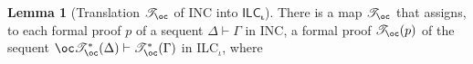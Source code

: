 \documentclass[a4paper]{article}
\theoremstyle{definition}
\theoremstyle{theorem}
\newtheorem{lemma}[definition]{Lemma}
\theoremstyle{remark}
\begin{document}
\begin{lemma}[Translation $\mathscr{T}_{\oc}$ of \textsf{INC} into $\textsf{ILC$_{\boldsymbol{\iota}}$}$]
\label{LemTranslationOfILK_muIntoILLK_mu}
There is a map $\mathscr{T}_{\oc}$ that assigns, to each formal proof $p$ of a sequent $\Delta \vdash \Gamma$ in \textsf{INC}, a formal proof $\mathscr{T}_{\oc}(p)$ of the sequent $\oc \mathscr{T}_{\oc}^\ast(\Delta) \vdash \mathscr{T}_{\oc}^\ast(\Gamma)$ in \textsf{ILC$_\iota$}, where
\end{lemma}
\end{document}
